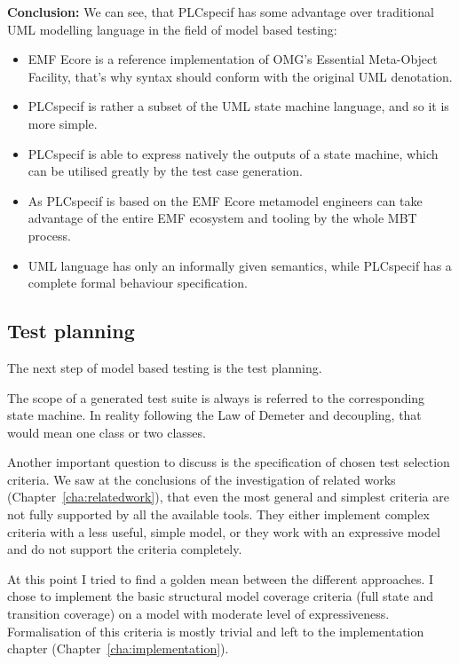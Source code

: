 \textbf{Conclusion:} We can see, that PLCspecif has some advantage over traditional UML modelling language in the field of model based testing:

\begin{itemize}
	\item EMF Ecore is a reference implementation of OMG's Essential Meta-Object Facility, that's why syntax should conform with the original UML denotation.
	\item PLCspecif is rather a subset of the UML state machine language, and so it is more simple.
	\item PLCspecif is able to express natively the outputs of a state machine, which can be utilised greatly by the test case generation.
	\item As PLCspecif is based on the EMF Ecore metamodel engineers can take advantage of the entire EMF ecosystem and tooling by the whole MBT process.
	\item UML language has only an informally given semantics, while PLCspecif has a complete formal behaviour specification.
\end{itemize}



\subsection{Test planning}
\label{sub:designtestplanning}

The next step of model based testing is the test planning.

The scope of a generated test suite is always is referred to the corresponding state machine. In reality following the Law of Demeter and decoupling, that would mean one class or two classes.

Another important question to discuss is the specification of chosen test selection criteria. We saw at the conclusions of the investigation of related works (Chapter~\ref{cha:relatedwork}), that even the most general and simplest criteria are not fully supported by all the available tools. They either implement complex criteria with a less useful, simple model, or they work with an expressive model and do not support the criteria completely.

At this point I tried to find a golden mean between the different approaches. I chose to implement the basic structural model coverage criteria (full state and transition coverage) on a model with moderate level of expressiveness. Formalisation of this criteria is mostly trivial and left to the implementation chapter (Chapter~\ref{cha:implementation}).

